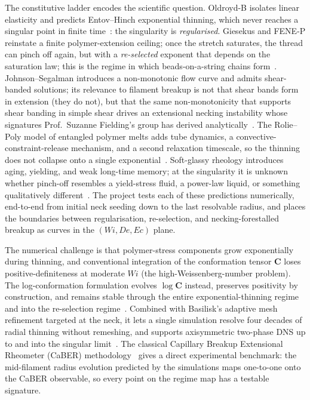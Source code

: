 \documentclass[11pt]{article}
\begin{document}
The constitutive ladder encodes the scientific question. Oldroyd-B isolates linear elasticity and predicts Entov--Hinch exponential thinning, which never reaches a singular point in finite time~\citep{entovHinch1997}: the singularity is \emph{regularised}. Giesekus and FENE-P reinstate a finite polymer-extension ceiling; once the stretch saturates, the thread can pinch off again, but with a \emph{re-selected} exponent that depends on the saturation law; this is the regime in which beads-on-a-string chains form~\citep{bhat2010beads}. Johnson--Segalman introduces a non-monotonic flow curve and admits shear-banded solutions; its relevance to filament breakup is not that shear bands form in extension (they do not), but that the same non-monotonicity that supports shear banding in simple shear drives an extensional necking instability whose signatures Prof.\ Suzanne Fielding's group has derived analytically~\citep{wilsonFielding2006,fielding2011necking,hoyleFielding2016necking}. The Rolie--Poly model of entangled polymer melts adds tube dynamics, a convective-constraint-release mechanism, and a second relaxation timescale, so the thinning does not collapse onto a single exponential~\citep{likhtmanGraham2003roliepoly}. Soft-glassy rheology introduces aging, yielding, and weak long-time memory; at the singularity it is unknown whether pinch-off resembles a yield-stress fluid, a power-law liquid, or something qualitatively different~\citep{sollich1997sgr}. The project tests each of these predictions numerically, end-to-end from initial neck seeding down to the last resolvable radius, and places the boundaries between regularisation, re-selection, and necking-forestalled breakup as curves in the $(Wi, De, Ec)$ plane.

The numerical challenge is that polymer-stress components grow exponentially during thinning, and conventional integration of the conformation tensor $\mathbf{C}$ loses positive-definiteness at moderate $Wi$ (the high-Weissenberg-number problem). The log-conformation formulation evolves $\log \mathbf{C}$ instead, preserves positivity by construction, and remains stable through the entire exponential-thinning regime and into the re-selection regime~\citep{fattalKupferman2004logconf}. Combined with Basilisk's adaptive mesh refinement targeted at the neck, it lets a single simulation resolve four decades of radial thinning without remeshing, and supports axisymmetric two-phase DNS up to and into the singular limit~\citep{popinet2015quadtree,basiliskVatsal}. The classical Capillary Breakup Extensional Rheometer (CaBER) methodology~\citep{mckinleyTripathi2000caber} gives a direct experimental benchmark: the mid-filament radius evolution predicted by the simulations maps one-to-one onto the CaBER observable, so every point on the regime map has a testable signature.
\end{document}
